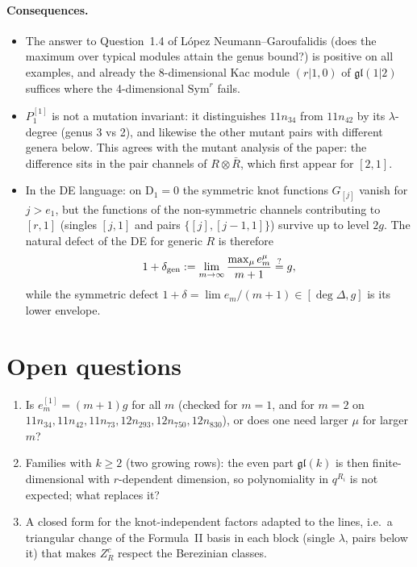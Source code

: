 \documentclass[11pt]{article}
\theoremstyle{remark}
\newcommand{\D}{\mathrm{D}}
\begin{document}
\paragraph{Consequences.}
\begin{itemize}
\item The answer to Question~1.4 of L\'opez Neumann--Garoufalidis (does the maximum over typical modules attain the
genus bound?) is positive on all examples, and already the 8-dimensional Kac module $(r|1,0)$ of
$\mathfrak{gl}(1|2)$ suffices where the 4-dimensional $\mathrm{Sym}^r$ fails.
\item $P^{[1]}_1$ is not a mutation invariant: it distinguishes $11n_{34}$ from $11n_{42}$ by its $\lambda$-degree
(genus 3 vs 2), and likewise the other mutant pairs with different genera below.  This agrees with the mutant
analysis of the paper: the difference sits in the pair channels of $R\otimes\bar R$, which first appear for $[2,1]$.
\item In the DE language: on $\D_1=0$ the symmetric knot functions $G_{[j]}$ vanish for $j>e_1$, but the functions of
the non-symmetric channels contributing to $[r,1]$ (singles $[j,1]$ and pairs $\{[j],[j-1,1]\}$) survive up to level
$2g$.  The natural defect of the DE for generic $R$ is therefore
\[
  1+\delta_{\rm gen}:=\lim_{m\to\infty}\frac{\max_\mu e^\mu_m}{m+1}\overset{?}{=}g,
\]
while the symmetric defect $1+\delta=\lim e_m/(m+1)\in[\deg\Delta,g]$ is its lower envelope.
\end{itemize}

\section{Open questions}
\begin{enumerate}
\item Is $e^{[1]}_m=(m+1)g$ for all $m$ (checked for $m=1$, and for $m=2$ on $11n_{34},11n_{42},11n_{73},12n_{293},12n_{750},12n_{830}$), or does one need larger $\mu$ for larger
$m$?
\item Families with $k\ge2$ (two growing rows): the even part $\mathfrak{gl}(k)$ is then finite-dimensional with
$r$-dependent dimension, so polynomiality in $q^{R_i}$ is not expected; what replaces it?
\item A closed form for the knot-independent factors adapted to the lines, i.e.\ a triangular change of the Formula~II
basis in each block (single $\lambda$, pairs below it) that makes $Z_R^c$ respect the Berezinian classes.
\end{enumerate}
\end{document}
